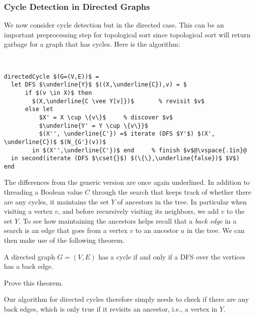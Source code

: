\subsubsection{Cycle Detection in Directed Graphs}

We now consider cycle detection but in the directed case.  This can be
an important preprocessing step for topological sort since topological
sort will return garbage for a graph that has cycles.  Here is the
algorithm:

\begin{algorithm}~
\label{lst:dfs::cycle-dir}
\begin{lstlisting}
directedCycle $(G=(V,E))$ = 
  let DFS $\underline{Y}$ $((X,\underline{C}),v) = $
      if $(v \in X)$ then 
        $(X,\underline{C \vee Y[v]})$       % revisit $v$
      else let
          $X' = X \cup \{v\}$     % discover $v$
          $\underline{Y' = Y \cup \{v\}}$
          $(X'', \underline{C'}) =$ iterate (DFS $Y'$) $(X',  \underline{C})$ $(N_{G'}(v))$
        in $(X'',\underline{C'})$ end     % finish $v$@\vspace{.1in}@
  in second(iterate (DFS $\cset{}$) $(\{\},\underline{false})$ $V$) end
\end{lstlisting}
\end{algorithm}

The differences from the generic version are once again underlined.
In addition to threading a Boolean value $C$ through the search that
keeps track of whether there are any cycles, it maintains the
set $Y$ of ancestors in the \dfs{} tree.   In particular when visiting a vertex $v$,
and before recursively visiting its neighbors, we add $v$ to the set $Y$.
To see how maintaining the ancestors helps recall that a \emph{back edge} in a \dfs{}
search is an edge that goes from a vertex $v$ to an ancestor $u$ in
the \dfs{} tree.
We can then make use of the following theorem.
\begin{theorem}
  A directed graph $G = (V,E)$ has a cycle if and only if 
  a DFS over the vertices has a back edge.
\end{theorem}

\begin{exercise}
Prove this theorem.
\end{exercise}
Our algorithm for directed cycles therefore simply needs to check if
there are any back edges, which is only true if it revisits an
ancestor, i.e., a vertex in $Y$.

